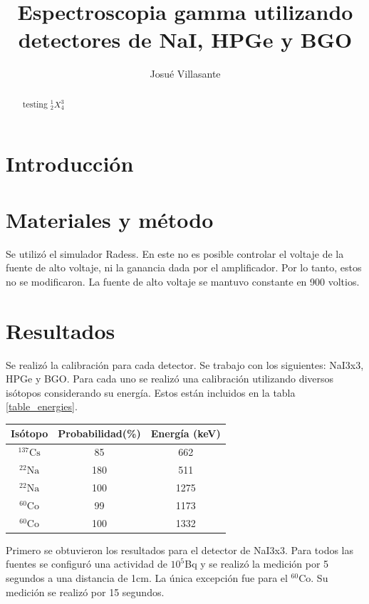 \documentclass[onecolumn]{article}
\author{Josué Villasante}
\title{Espectroscopia gamma utilizando detectores de NaI, HPGe y BGO}
\begin{document}
	\maketitle
	\begin{abstract}
		testing
		${}^1_2X^3_4$
	\end{abstract}

	\section{Introducción}
	
	\section{Materiales y método}
		Se utilizó el simulador Radess. En este no es posible controlar el voltaje de la fuente de alto voltaje, ni la ganancia dada por el amplificador. Por lo tanto, estos no se modificaron. La fuente de alto voltaje se mantuvo constante en 900 voltios.

	\section{Resultados}	
		Se realizó la calibración para cada detector. Se trabajo con los siguientes: NaI3x3, HPGe y BGO. Para cada uno se realizó una calibración utilizando diversos isótopos considerando su energía. Estos están incluidos en la tabla \ref{table_energies}.

		\begin{center}
			{\renewcommand{\arraystretch}{1.5}
			\renewcommand{\tabcolsep}{0.2cm}
			\label{table_energies}
			\begin{tabular}{ c c c }
				\hline
				Isótopo & Probabilidad(\%) & Energía (keV) \\
				\hline
				${}^{137}\mathrm{Cs}$ & 85 & 662 \\ 
				${}^{22}\mathrm{Na}$ & 180 & 511 \\ 
				${}^{22}\mathrm{Na}$ & 100 & 1275 \\ 
				${}^{60}\mathrm{Co}$ & 99 & 1173 \\ 
				${}^{60}\mathrm{Co}$ & 100 & 1332
			\end{tabular}}
		\end{center}

		Primero se obtuvieron los resultados para el detector de NaI3x3. Para todos las fuentes se configuró una actividad de $10^5$Bq y se realizó la medición por 5 segundos a una distancia de 1cm. La única excepción fue para el ${}^{60}\mathrm{Co}$. Su medición se realizó por 15 segundos.
\end{document}
